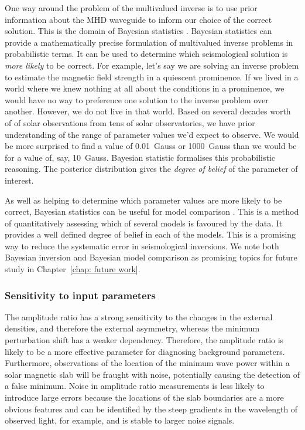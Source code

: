One way around the problem of the multivalued inverse is to use prior information about the MHD waveguide to inform our choice of the correct solution. This is the domain of Bayesian statistics \citep{arr_etal11,arr_etal18}. Bayesian statistics can provide a mathematically precise formulation of multivalued inverse problems in probabilistic terms. It can be used to determine which seismological solution is \textit{more likely} to be correct. For example, let's say we are solving an inverse problem to estimate the magnetic field strength in a quiescent prominence. If we lived in a world where we knew nothing at all about the conditions in a prominence, we would have no way to preference one solution to the inverse problem over another. However, we do not live in that world. Based on several decades worth of of solar observations from tens of solar observatories, we have prior understanding of the range of parameter values we'd expect to observe. We would be more surprised to find a value of 0.01~Gauss or 1000~Gauss than we would be for a value of, say, 10~Gauss. Bayesian statistic formalises this probabilistic reasoning. The posterior distribution gives the \textit{degree of belief} of the parameter of interest.

As well as helping to determine which parameter values are more likely to be correct, Bayesian statistics can be useful for model comparison \citep{arr_etal18}. This is a method of quantitatively assessing which of several models is favoured by the data. It provides a well defined degree of belief in each of the models. This is a promising way to reduce the systematic error in seismological inversions. We note both Bayesian inversion and Bayesian model comparison as promising topics for future study in Chapter~\ref{chap: future work}.


\subsubsection{Sensitivity to input parameters}

The amplitude ratio has a strong sensitivity to the changes in the external densities, and therefore the external asymmetry, whereas the minimum perturbation shift has a weaker dependency. Therefore, the amplitude ratio is likely to be a more effective parameter for diagnosing background parameters. Furthermore, observations of the location of the minimum wave power within a solar magnetic slab will be fraught with noise, potentially causing the detection of a false minimum. Noise in amplitude ratio measurements is less likely to introduce large errors because the locations of the slab boundaries are a more obvious features and can be identified by the steep gradients in the wavelength of observed light, for example, and is stable to larger noise signals.

